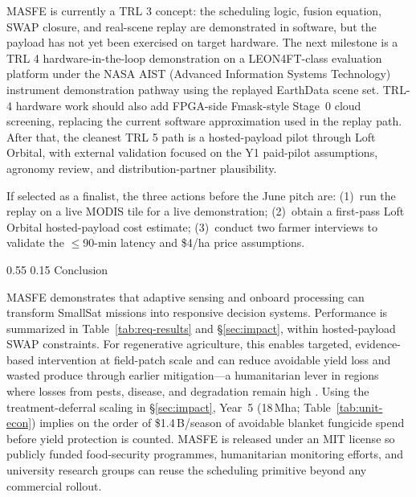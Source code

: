 \documentclass[11pt,letterpaper]{article}
\makeatletter
\renewcommand\section{\@startsection{section}{1}{\z@}
  {0.55\baselineskip}
  {0.15\baselineskip}
  {\normalfont\large\bfseries}}
\makeatother
\begin{document}
MASFE is currently a TRL 3 concept: the scheduling logic, fusion equation, SWAP closure, and real-scene replay are demonstrated in software, but the payload has not yet been exercised on target hardware. The next milestone is a TRL 4 hardware-in-the-loop demonstration on a LEON4FT-class evaluation platform under the NASA AIST (Advanced Information Systems Technology) instrument demonstration pathway using the replayed EarthData scene set. TRL-4 hardware work should also add FPGA-side Fmask-style Stage~0 cloud screening, replacing the current software approximation used in the replay path. After that, the cleanest TRL 5 path is a hosted-payload pilot through Loft Orbital, with external validation focused on the Y1 paid-pilot assumptions, agronomy review, and distribution-partner plausibility.

If selected as a finalist, the three actions before the June pitch are: (1)~run the replay on a live MODIS tile for a live demonstration; (2)~obtain a first-pass Loft Orbital hosted-payload cost estimate; (3)~conduct two farmer interviews to validate the $\leq$90-min latency and \$4/ha price assumptions.


\section{Conclusion}

\label{chapter:conclusion}

MASFE demonstrates that adaptive sensing and onboard processing can transform SmallSat missions into responsive decision systems. Performance is summarized in Table~\ref{tab:req-results} and \S\ref{sec:impact}, within hosted-payload SWAP constraints. For regenerative agriculture, this enables targeted, evidence-based intervention at field-patch scale and can reduce avoidable yield loss and wasted produce through earlier mitigation---a humanitarian lever in regions where losses from pests, disease, and degradation remain high \cite{fao-plant-production,ifc-food-loss-2017}. Using the treatment-deferral scaling in \S\ref{sec:impact}, Year~5 (18\,Mha; Table~\ref{tab:unit-econ}) implies on the order of \$1.4\,B/season of avoidable blanket fungicide spend before yield protection is counted. MASFE is released under an MIT license so publicly funded food-security programmes, humanitarian monitoring efforts, and university research groups can reuse the scheduling primitive beyond any commercial rollout.

\clearpage
\normalsize


\end{document}

